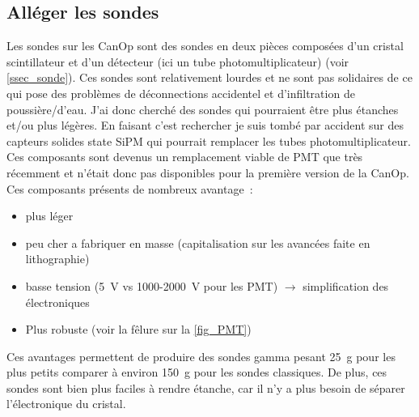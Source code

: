 \subsection{Alléger les sondes}
Les sondes sur les CanOp sont des sondes en deux pièces composées d'un cristal scintillateur et d'un détecteur (ici un tube photomultiplicateur) (voir \cref{ssec_sonde}). Ces sondes sont relativement lourdes et ne sont pas solidaires de ce qui pose des problèmes de déconnections accidentel et d'infiltration de poussière/d'eau. %
J'ai donc cherché des sondes qui pourraient être plus étanches et/ou plus légères. En faisant c'est rechercher je suis tombé par accident sur des capteurs solides state SiPM qui pourrait remplacer les tubes photomultiplicateur. Ces composants sont devenus un remplacement viable de PMT que très récemment et n'était donc pas disponibles pour la première version de la CanOp. Ces composants présents de nombreux avantage~:
\begin{itemize}
    \item plus léger
    \item peu cher a fabriquer en masse (capitalisation sur les avancées faite en lithographie)
    \item basse tension (5~V vs 1000-2000~V pour les PMT) $\rightarrow$ simplification des électroniques
    \item Plus robuste (voir la fêlure sur la \cref{fig_PMT})
\end{itemize}

Ces avantages permettent de produire des sondes gamma pesant 25~g\cite{} pour les plus petits comparer à environ 150~g\cite{} pour les sondes classiques. De plus, ces sondes sont bien plus faciles à rendre étanche, car il n'y a plus besoin de séparer l'électronique du cristal.
